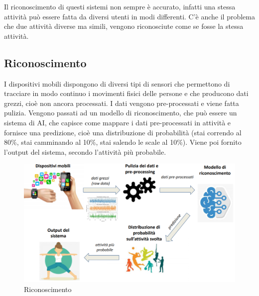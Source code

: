 Il riconoscimento di questi sistemi non sempre è accurato, infatti una stessa attività può essere fatta da diversi utenti in modi differenti. 
C'è anche il problema che due attività diverse ma simili, vengono riconosciute come se fosse la stessa attività. 

\subsection{Riconoscimento}
I dispositivi mobili dispongono di diversi tipi di sensori che permettono di tracciare in modo continuo i movimenti fisici delle persone e che producono dati grezzi, cioè non ancora processati.
I dati vengono pre-processati e viene fatta pulizia.
Vengono passati ad un modello di riconoscimento, che può essere un sistema di AI, che capisce come mappare i dati pre-processati in attività e fornisce una predizione, cioè una distribuzione di probabilità (stai correndo al 80\%, stai camminando al 10\%, stai salendo le scale al 10\%). Viene poi fornito l'output del sistema, secondo l'attività più probabile. 
\vspace{1em}
\begin{figure}[!ht]
    \centering
    \includegraphics[width=.95\textwidth]{images/MobiDEV/6. activity recognition/processing.PNG}
    \caption{Riconoscimento}
    \label{fig:riconoscimento}
\end{figure}


